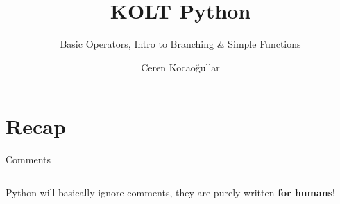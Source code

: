 
\usepackage{../KU-Beamer-Template/style/koc} 
\usepackage{minted}
\usepackage{upquote}
\usepackage{graphicx}
\usepackage{tikz}
\usetikzlibrary{shapes.symbols,positioning, chains}


\title{KOLT Python}
\subtitle{Basic Operators, Intro to Branching \& Simple Functions} 
\date{}
\author{Ceren Kocaoğullar}


\makeatletter
\let\@@magyar@captionfix\relax
\makeatother

    \maketitle

    \section{Recap}
        \begin{frame}{Comments}
            \LARGE
            \inputminted[frame=single,framesep=2pt]{python3}{code-examples/comments.py}
            Python will basically ignore comments, they are purely written \textbf{for humans}!
        \end{frame}

